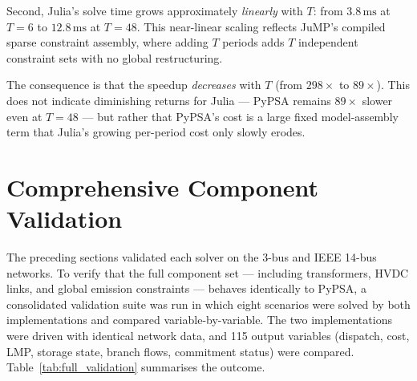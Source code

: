 Second, Julia's solve time grows approximately \emph{linearly} with $T$: from $3.8\,\text{ms}$ at $T = 6$ to $12.8\,\text{ms}$ at $T = 48$. This near-linear scaling reflects JuMP's compiled sparse constraint assembly, where adding $T$ periods adds $T$ independent constraint sets with no global restructuring.

The consequence is that the speedup \emph{decreases} with $T$ (from $298\times$ to $89\times$). This does not indicate diminishing returns for Julia --- PyPSA remains $89\times$ slower even at $T = 48$ --- but rather that PyPSA's cost is a large fixed model-assembly term that Julia's growing per-period cost only slowly erodes.

\section{Comprehensive Component Validation}
\label{sec:full_validation}

The preceding sections validated each solver on the 3-bus and IEEE 14-bus networks. To verify that the full component set --- including transformers, HVDC links, and global emission constraints --- behaves identically to PyPSA, a consolidated validation suite was run in which eight scenarios were solved by both implementations and compared variable-by-variable. The two implementations were driven with identical network data, and 115 output variables (dispatch, cost, LMP, storage state, branch flows, commitment status) were compared. Table~\ref{tab:full_validation} summarises the outcome.

